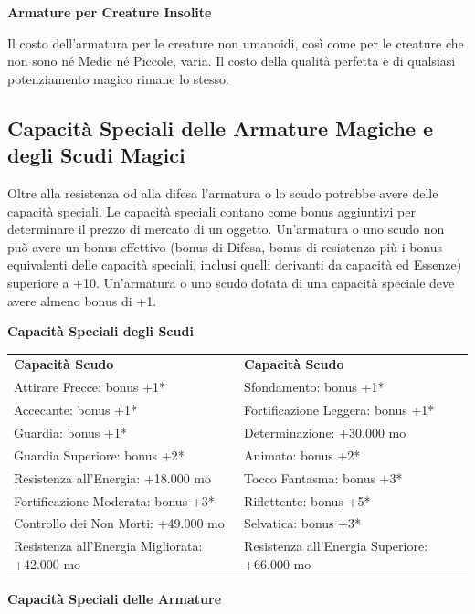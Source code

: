 \documentclass[a4paper,11pt,twoside,openany]{book}
\begin{document}
\textbf{Armature per Creature Insolite}

Il costo dell'armatura per le creature non umanoidi, così come per le creature che non sono né Medie né Piccole, varia. Il costo della qualità perfetta e di qualsiasi potenziamento magico rimane lo stesso.



\subsection{Capacità Speciali delle Armature Magiche e degli Scudi Magici}

\label{capacita-speciali-delle-armature-magiche-e-degli-scudi-magici}

Oltre alla resistenza od alla difesa l'armatura o lo scudo potrebbe avere delle capacità speciali. Le capacità speciali contano come bonus aggiuntivi per determinare il prezzo di mercato di un oggetto. Un'armatura o uno scudo non può avere un bonus effettivo (bonus di Difesa, bonus di resistenza più i bonus equivalenti delle capacità speciali, inclusi quelli derivanti da capacità ed Essenze) superiore a +10. Un'armatura o uno scudo dotata di una capacità speciale deve avere almeno bonus di +1.

\bigskip

\textbf{Capacità Speciali degli Scudi}

\medskip

\begin{tabular}{ll}
	\toprule
	\textbf{Capacità Scudo}                       & \textbf{Capacità Scudo}\tabularnewline
	Attirare Frecce: bonus +1{*}                  & Sfondamento: bonus +1{*}\tabularnewline
	Accecante: bonus +1{*}                        & Fortificazione Leggera: bonus +1{*}\tabularnewline
	Guardia: bonus +1{*}                          & Determinazione: +30.000 mo\tabularnewline
	Guardia Superiore: bonus +2{*}                & Animato: bonus +2{*}\tabularnewline
	Resistenza all'Energia: +18.000 mo            & Tocco Fantasma: bonus +3{*}\tabularnewline
	Fortificazione Moderata: bonus +3{*}          & Riflettente: bonus +5{*}\tabularnewline
	Controllo dei Non Morti: +49.000 mo           & Selvatica: bonus +3{*}\tabularnewline
	Resistenza all'Energia Migliorata: +42.000 mo & Resistenza all'Energia Superiore: +66.000 mo\tabularnewline
\end{tabular}

\bigskip

\textbf{Capacità Speciali delle Armature}
\end{document}

